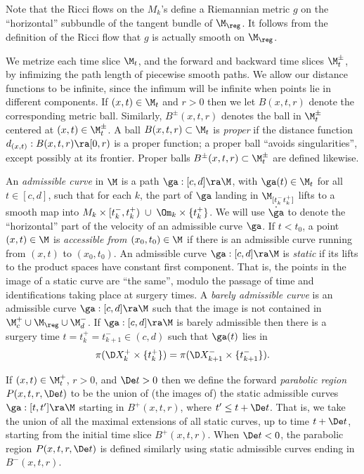 Note that the Ricci
flows on the $M_k$'s define a Riemannian metric $g$ on the ``horizontal''
subbundle of the tangent bundle of $\M_{\reg}$.  It follows from the
definition of the Ricci flow that $g$ is actually smooth on $\M_{\reg}$.


We metrize each time slice $\M_t$, and the forward and backward time
slices $\M_t^\pm$, by infimizing the path length of piecewise smooth paths.
We allow our distance functions to be infinite,
since the infimum will be infinite when points lie in different components.
If $(x,t)\in \M_t$ and $r>0$ then we let $B(x,t,r)$ denote the
corresponding metric ball. Similarly,  $B^\pm(x,t,r)$ denotes
the ball in $\M_t^\pm$ centered at $(x,t)\in\M_t^\pm$.
A ball $B(x,t,r)\subset\M_t$ is {\em proper} if the distance
function $d_{(x,t)}:B(x,t,r)\ra [0,r)$ is a proper function;
a proper ball ``avoids singularities'', except possibly at its
frontier.
Proper balls $B^\pm(x,t,r)\subset\M_t^\pm$ are defined likewise.

An {\em admissible curve} in $\M$ is a path $\ga:[c,d]\ra \M$,
with $\ga(t)\in \M_t$ for all $t\in [c,d]$, such that
for each $k$, the part of $\ga$ landing in $\M_{[t_k^-t_k^+]}$
lifts to a smooth map into
$M_k\times[t_k^-,t_k^+)\;\cup \;\Om_k\times\{t_k^+\}$.  We will
use $\dot{\ga}$ to denote the ``horizontal'' part of the velocity
of an admissible curve $\ga$.
If $t < t_0$,
a point $(x,t)\in\M$ is
{\em accessible from $(x_0,t_0)\in\M$} if there is an admissible curve
running from $(x,t)$ to $(x_0,t_0)$.  An
admissible curve $\ga:[c,d]\ra\M$ is {\em static} if
its lifts to the product spaces have constant first component. That is,
the points in the image of a  static curve are ``the same'',
modulo the passage of time and identifications taking place
at surgery times.
 A {\em barely
admissible curve} is an admissible curve $\ga:[c,d]\ra\M$
such that the  image is not contained
in $\M_c^+ \cup \M_{\reg}\cup \M_d^-$.
If $\ga:[c,d]\ra\M$ is barely admissible then
there is a surgery time $t=t_k^+=t_{k+1}^-\in(c,d)$ such that
$\ga(t)$ lies in
\begin{equation}
\pi(\D X_k^+\times\{t_k^+\})
=\pi(\D X_{k+1}^-\times\{t_{k+1}^-\}).
\end{equation}

If $(x,t)\in\M_t^+$, $r>0$, and $\De t>0$ then we define the
forward {\em parabolic region }
$P(x,t,r,\De t)$ to be the union of
(the images of) the static
admissible curves $\ga:[t,t^\prime] \ra \M$ starting in $B^+(x,t,r)$, where
$t^\prime \le t+\De t$. That is, we take the union of all the maximal
extensions of all static
curves, up to time $t + \De t$, starting from the
initial time slice $B^+(x,t,r)$.
When $\De t<0$, the parabolic region $P(x,t,r,\De t)$ is defined
similarly using static admissible curves ending in $B^-(x,t,r)$.

